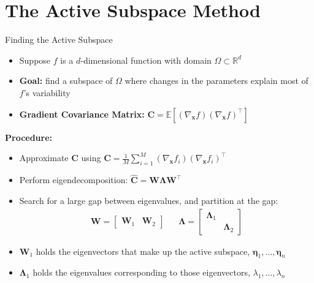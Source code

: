 \documentclass[10pt]{beamer}
\begin{document}
\section{The Active Subspace Method}
\begin{frame}{Finding the Active Subspace}
\begin{itemize}
    \item Suppose $f$ is a $d$-dimensional function with domain $\Omega \subset \mathbb{R}^d$

    \item \textbf{Goal:} find a subspace of $\Omega$ where changes in the parameters explain most of $f$'s variability
    
    \item \textbf{Gradient Covariance Matrix:} $\bm{C} = \mathbb{E}\left[\left(\nabla_{\bm{x}}f\right)\left(\nabla_{\bm{x}}f\right)^\top \right]$
\end{itemize}
\textbf{Procedure:}
\begin{itemize}
    \item Approximate $\bm{C}$ using $\hat{\bm{C}}=\frac{1}{M}\sum_{i=1}^{M}(\nabla_{\bm{x}} f_i)(\nabla_{\bm{x}} f_i)^\top$
    
    \item Perform eigendecomposition: $\hat{\bm{C}} = \bm{W}\boldsymbol{\Lambda}\bm{W}^\top$
    
    \item Search for a large gap between eigenvalues, and partition at the gap:
    \begin{align*}
        \bm{W} = 
        \begin{bmatrix}
            \bm{W}_1 & \bm{W}_2
        \end{bmatrix}
        && \bm{\Lambda} =
        \begin{bmatrix}
            \bm{\Lambda}_1 & \\
            & \bm{\Lambda}_2
        \end{bmatrix}
    \end{align*}
    
    \item $\bm{W}_1$ holds the eigenvectors that make up the active subspace, $\bm{\eta}_1, \dots, \bm{\eta}_n$
    
    \item $\bm{\Lambda}_1$ holds the eigenvalues corresponding to those eigenvectors, $\lambda_1, \dots, \lambda_n$
\end{itemize}
\end{frame}
\end{document}

